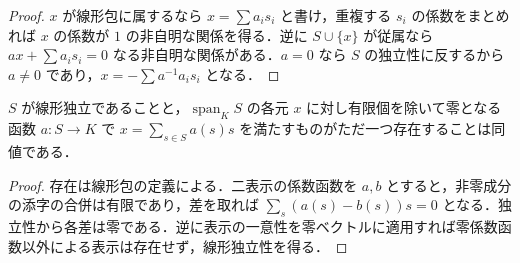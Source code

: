 \begin{proof}
$x$ が線形包に属するなら $x=\sum a_is_i$ と書け，重複する $s_i$ の係数をまとめれば $x$ の係数が $1$ の非自明な関係を得る．逆に $S\cup\{x\}$ が従属なら $ax+\sum a_is_i=0$ なる非自明な関係がある．$a=0$ なら $S$ の独立性に反するから $a\ne0$ であり，$x=-\sum a^{-1}a_is_i$ となる．
\end{proof}
\begin{prop}[線形結合の一意性]
$S$ が線形独立であることと，$\operatorname{span}_K S$ の各元 $x$ に対し有限個を除いて零となる函数 $a:S\to K$ で $x=\sum_{s\in S}a(s)s$ を満たすものがただ一つ存在することは同値である．
\end{prop}
\begin{proof}
存在は線形包の定義による．二表示の係数函数を $a,b$ とすると，非零成分の添字の合併は有限であり，差を取れば $\sum_s(a(s)-b(s))s=0$ となる．独立性から各差は零である．逆に表示の一意性を零ベクトルに適用すれば零係数函数以外による表示は存在せず，線形独立性を得る．
\end{proof}
